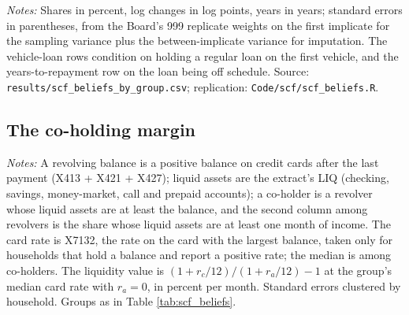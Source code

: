 \begin{table}[H]
\centering
\caption{Beliefs by group, with standard errors}
\label{tab:scf_beliefs_se}
\footnotesize
\resizebox{\textwidth}{!}{}
\vspace{0.5em}
\begin{minipage}{0.95\textwidth}
\small \textit{Notes:} Shares in percent, log changes in log points, years in years; standard errors in parentheses, from the Board's 999 replicate weights on the first implicate for the sampling variance plus the between-implicate variance for imputation. The vehicle-loan rows condition on holding a regular loan on the first vehicle, and the years-to-repayment row on the loan being off schedule. Source: \texttt{results/scf\_beliefs\_by\_group.csv}; replication: \texttt{Code/scf/scf\_beliefs.R}.
\end{minipage}
\end{table}

\subsection{The co-holding margin}

\begin{table}[H]
\centering
\caption{The co-holding margin in the Survey of Consumer Finances, by group}
\label{tab:scf_coholding}
\footnotesize
\resizebox{\textwidth}{!}{}
\vspace{0.5em}
\begin{minipage}{0.95\textwidth}
\small \textit{Notes:} A revolving balance is a positive balance on credit cards after the last payment (X413 + X421 + X427); liquid assets are the extract's LIQ (checking, savings, money-market, call and prepaid accounts); a co-holder is a revolver whose liquid assets are at least the balance, and the second column among revolvers is the share whose liquid assets are at least one month of income. The card rate is X7132, the rate on the card with the largest balance, taken only for households that hold a balance and report a positive rate; the median is among co-holders. The liquidity value is $(1 + r_{c}/12)/(1 + r_{a}/12) - 1$ at the group's median card rate with $r_{a} = 0$, in percent per month. Standard errors clustered by household. Groups as in Table \ref{tab:scf_beliefs}.
\end{minipage}
\end{table}


